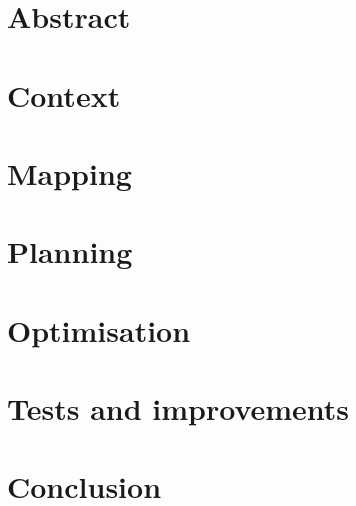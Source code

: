 \documentclass{report}
\begin{document}


\chapter*{Abstract}


\tableofcontents

\chapter{Context}


\chapter{Mapping}


\chapter{Planning}


\chapter{Optimisation}


\chapter{Tests and improvements}


\chapter*{Conclusion}


\listofalgorithms
{}
\end{document}
